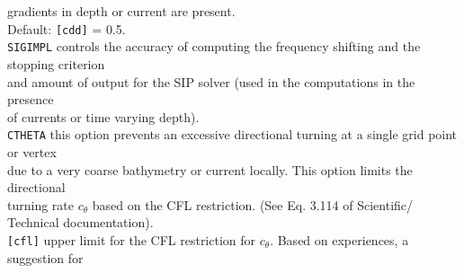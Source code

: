 \documentclass[12pt]{book}
\begin{document}
\begin{tabbing}
                  gradients in depth or current are present.\\
                  Default: {\tt [cdd]} = 0.5.\-\\
{\tt SIGIMPL}  \> controls the accuracy of computing the frequency shifting and the stopping criterion\+\\
                  and amount of output for the SIP solver (used in the computations in the presence\\
                  of currents or time varying depth).\-\\
{\tt CTHETA}   \> this option prevents an excessive directional turning at a single grid point or vertex\+\\
                  due to a very coarse bathymetry or current locally. This option limits the directional\\
                  turning rate $c_{\theta}$ based on the CFL restriction. (See Eq. 3.114 of Scientific/\\
                  Technical documentation).\-\\
{\tt [cfl]}    \> upper limit for the CFL restriction for $c_{\theta}$. Based on experiences, a suggestion for\+\\

\end{tabbing}
\end{document}
